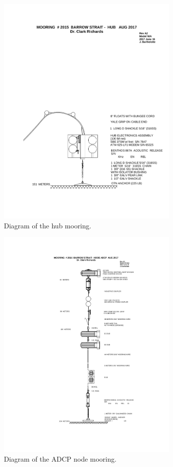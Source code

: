 \documentclass[12pt]{dforeport}
\begin{document}
\begin{figure}
\centering
\includegraphics[width = 0.8\textwidth]{./figures/HUB.png}
\caption[Mooring Diagram: hub]{Diagram of the hub mooring.}
\label{f:md_hub}
\end{figure}

\begin{figure}
\centering
\includegraphics[width = 0.8\textwidth]{./figures/ADCP.png}
\caption[Mooring Diagram: ADCP node]{Diagram of the ADCP node mooring.}
\label{f:md_adcp}
\end{figure}
\end{document}
